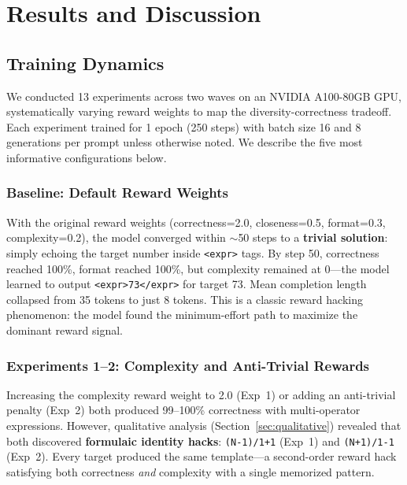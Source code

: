 \documentclass[11pt, letterpaper]{article}
\begin{document}
\section{Results and Discussion}
\label{sec:results}

\subsection{Training Dynamics}

We conducted 13 experiments across two waves on an NVIDIA A100-80GB GPU, systematically varying reward weights to map the diversity-correctness tradeoff. Each experiment trained for 1 epoch (250 steps) with batch size 16 and 8 generations per prompt unless otherwise noted. We describe the five most informative configurations below.

\subsubsection{Baseline: Default Reward Weights}

With the original reward weights (correctness=2.0, closeness=0.5, format=0.3, complexity=0.2), the model converged within $\sim$50 steps to a \textbf{trivial solution}: simply echoing the target number inside \texttt{<expr>} tags. By step 50, correctness reached 100\%, format reached 100\%, but complexity remained at 0---the model learned to output \texttt{<expr>73</expr>} for target 73. Mean completion length collapsed from 35 tokens to just 8 tokens. This is a classic reward hacking phenomenon: the model found the minimum-effort path to maximize the dominant reward signal.

\subsubsection{Experiments 1--2: Complexity and Anti-Trivial Rewards}

Increasing the complexity reward weight to 2.0 (Exp~1) or adding an anti-trivial penalty (Exp~2) both produced 99--100\% correctness with multi-operator expressions. However, qualitative analysis (Section~\ref{sec:qualitative}) revealed that both discovered \textbf{formulaic identity hacks}: \texttt{(N-1)/1+1} (Exp~1) and \texttt{(N+1)/1-1} (Exp~2). Every target produced the same template---a second-order reward hack satisfying both correctness \emph{and} complexity with a single memorized pattern.
\end{document}
